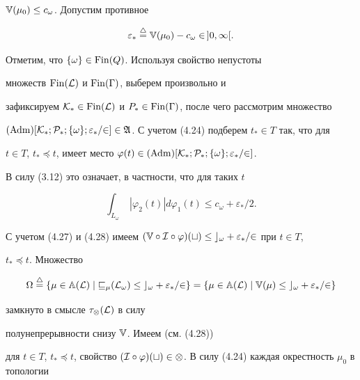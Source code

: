 \begin{pf}
$\Bbb V(\mu_0)\le c_\omega$. Допустим противное


$$


\varepsilon_*\overset{\triangle}{=}\Bbb V(\mu_0)-c_\omega\in\,]0,\infty[.


$$


Отметим, что $\{\omega\}\in \operatorname{Fin}(Q)$. Используя свойство непустоты


множеств $\operatorname{Fin}(\cal L)$ и $\operatorname{Fin}(\Gamma)$, выберем произвольно и


зафиксируем $\cal K_*\in \Fin(\cal L)$ и $P_*\in


\Fin(\Gamma)$, после чего рассмотрим множество


$(\Adm)[\cal K_*;P_*;\{\omega\};\varepsilon_*/2]\in


\frak A$. С учетом (4.24) подберем $t_*\in T$ так, что для


$t\in T$, $t_*\preceq t$, имеет место $\varphi(t)\in


(\Adm)[\cal K_*;P_*;\{\omega\};\varepsilon_*/2]$.


В силу (3.12) это означает, в частности, что для таких $t$


\begin{equation}


\int_{L_\omega}\;|\varphi_2(t)|d\varphi_1(t)\le


c_\omega+\varepsilon_*/2.


\end{equation}


С учетом (4.27) и (4.28) имеем $(\Bbb V\circ\cal I\circ


\varphi)(t)\le c_\omega+\varepsilon_*/2$ при $t\in T$,


${t_*}\preceq t$. Множество


$$


\Omega\overset{\triangle}{=}\{\mu\in\Bbb A(\cal L)\mid


v_\mu(L_\omega)\le c_\omega+\varepsilon_*/2\}=


\{\mu\in\Bbb A(\cal L)\mid\Bbb V(\mu)\le


c_\omega+\varepsilon_*/2\}


$$


замкнуто в смысле $\tau_\otimes(\cal L)$ в силу


полунепрерывности снизу $\Bbb V$. Имеем (см. (4.28))


для $t\in T$, $t_*\preceq t$, свойство $(\cal I\circ\varphi)(t)\in


\Omega$. В силу (4.24) каждая окрестность $\mu_0$ в топологии



\end{pf}

